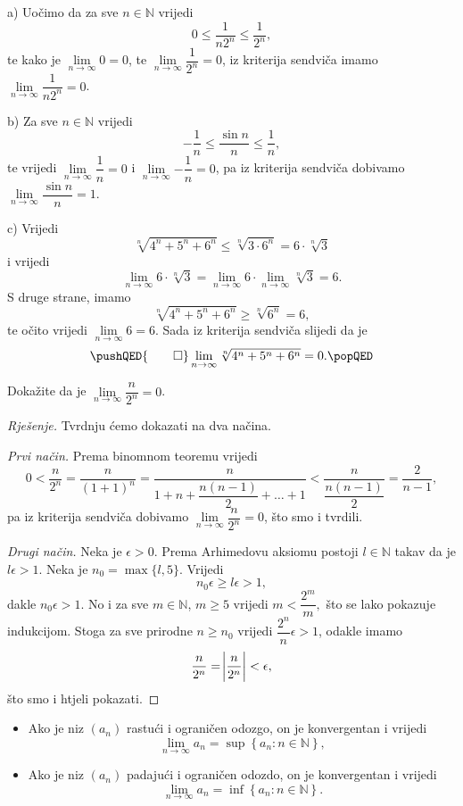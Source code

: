 \begin{proof*}
a) Uočimo da za sve $n\in \mathbb{N}$ vrijedi
$$0\leq \dfrac{1}{n2^n}\leq \dfrac{1}{2^n},$$
te kako je $\lim\limits_{n\to \infty}{0}=0$, te $\lim\limits_{n\to \infty}{\dfrac{1}{2^n}}=0$, iz kriterija sendviča imamo $\lim\limits_{n\to \infty}{\dfrac{1}{n2^n}}=0$.

b) Za sve $n\in \mathbb{N}$ vrijedi
$$-\dfrac{1}{n}\leq \dfrac{\sin{n}}{n}\leq \dfrac{1}{n},$$
te vrijedi $\lim\limits_{n\to \infty}{\dfrac{1}{n}}=0$ i $\lim\limits_{n\to \infty}{-\dfrac{1}{n}}=0$, pa iz kriterija sendviča dobivamo $\lim\limits_{n\to \infty}{\dfrac{\sin{n}}{n}}=1$.

c) Vrijedi $$\sqrt[n]{4^n+5^n+6^n}\leq \sqrt[n]{3\cdot 6^n}=6\cdot \sqrt[n]{3}$$ i vrijedi $$\lim\limits_{n\to \infty}{6\cdot \sqrt[n]{3}}=\lim\limits_{n\to \infty}{6}\cdot \lim\limits_{n\to \infty}{\sqrt[n]{3}}=6.$$ S druge strane, imamo $$\sqrt[n]{4^n+5^n+6^n}\geq \sqrt[n]{6^n}=6,$$ 
te očito vrijedi $\lim\limits_{n\to \infty}{6}=6$. Sada iz kriterija sendviča slijedi da je
\[
\pushQED{\qed}
\lim\limits_{n\to \infty}{\sqrt[n]{4^n+5^n+6^n}}=0.\qedhere
\popQED
\]
\end{proof*}
\begin{exercise}
\label{7}
Dokažite da je $\lim\limits_{n\to \infty}{\dfrac{n}{2^n}}=0$.
\end{exercise}
\begin{proof}[Rješenje] Tvrdnju ćemo dokazati na dva načina.

\textit{Prvi način.} Prema binomnom teoremu vrijedi
$$0<\dfrac{n}{2^n}=\dfrac{n}{(1+1)^n}=\dfrac{n}{1+n+\dfrac{n(n-1)}{2}+\dots+1}<\dfrac{n}{\dfrac{n(n-1)}{2}}=\dfrac{2}{n-1},$$
pa iz kriterija sendviča dobivamo $\lim\limits_{n\to \infty}{\dfrac{n}{2^n}}=0$, što smo i tvrdili.

\textit{Drugi način.} Neka je $\epsilon>0$. Prema Arhimedovu aksiomu postoji $l\in \mathbb{N}$ takav da je $l\epsilon>1$. Neka je $n_0=\max\{l, 5\}$. Vrijedi
$$n_0\epsilon\geq l\epsilon>1,$$
dakle $n_0\epsilon>1$. No i za sve $m\in \mathbb{N}$, $m\geq 5$ vrijedi $m<\dfrac{2^m}{m},$ što se lako pokazuje indukcijom. Stoga za sve prirodne $n\geq n_0$ vrijedi $\dfrac{2^{n}}{n}\epsilon>1$, odakle imamo $$\dfrac{n}{2^n}=\abs{\dfrac{n}{2^n}}<\epsilon,$$
što smo i htjeli pokazati.
\end{proof}
\begin{remark} \textbf{}
\label{suffcond}
\begin{itemize}
\item Ako je niz $(a_n)$ rastući i ograničen odozgo, on je konvergentan i vrijedi $$\lim\limits_{n\to\infty}{a_n}=\sup{\left\{a_n : n\in \mathbb{N}\right\}},$$
\item Ako je niz $(a_n)$ padajući i ograničen odozdo, on je konvergentan i vrijedi $$\lim\limits_{n\to\infty}{a_n}=\inf{\left\{a_n : n\in \mathbb{N}\right\}}.$$
\end{itemize}
\end{remark}
